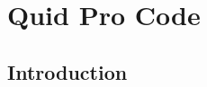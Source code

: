 \documentclass[11pt]{report}
\begin{document}
\chapter{Quid Pro Code}\label{ch:pub-goods}

\section{Introduction} \label{sec:intro}


% 

% 

% 

% 

% 

% 


% 

% 
\end{document}
